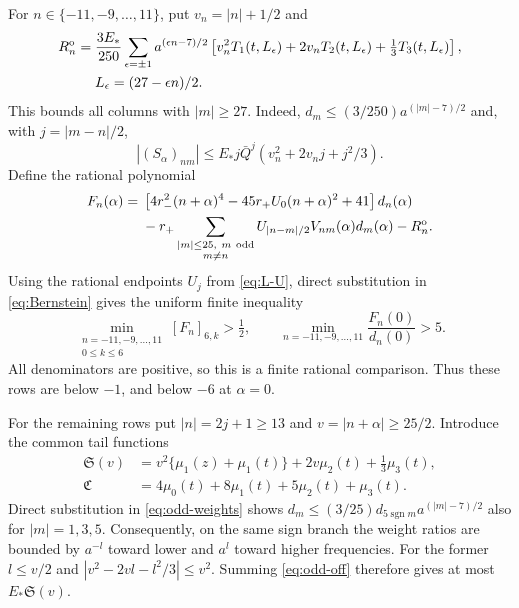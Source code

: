 \documentclass[a4paper,11pt]{article}
\numberwithin{equation}{section}
\theoremstyle{definition}
\theoremstyle{remark}
\begin{document}
For $n\in\{-11,-9,\ldots,11\}$, put $v_n=|n|+1/2$ and
\begin{align}
 R_n^{\rm o}={}&\frac{3E_*}{250}\sum_{\epsilon=\pm1}a^{(\epsilon n-7)/2}
 \left[v_n^2T_1(t,L_\epsilon)+2v_nT_2(t,L_\epsilon)
 +\tfrac13T_3(t,L_\epsilon)\right],\label{eq:odd-row-tail}\\
 &L_\epsilon=(27-\epsilon n)/2.\nonumber
\end{align}
This bounds all columns with $|m|\ge27$. Indeed, $d_m\le(3/250)a^{(|m|-7)/2}$ and, with $j=|m-n|/2$,
\begin{equation}\label{eq:complex-off-majorant}
 |(S_\alpha)_{nm}|\le E_*j\bar Q^j
 (v_n^2+2v_nj+j^2/3).
\end{equation}
Define the rational polynomial
\begin{align}
 F_n(\alpha)={}&\left[4r_-^2(n+\alpha)^4-45r_+U_0(n+\alpha)^2+41\right]d_n(\alpha)
 \nonumber\\
 &-r_+\sum_{\substack{|m|\le25,\ m\ \mathrm{odd}\\m\ne n}}
 U_{|n-m|/2}V_{nm}(\alpha)d_m(\alpha)-R_n^{\rm o}.
 \label{eq:odd-F}
\end{align}
Using the rational endpoints $U_j$ from \eqref{eq:L-U}, direct substitution in \eqref{eq:Bernstein} gives the uniform finite inequality
\begin{equation}\label{eq:odd-uniform}
 \min_{\substack{n=-11,-9,\ldots,11\\0\le k\le6}}[F_n]_{6,k}>\tfrac12,\qquad
 \min_{n=-11,-9,\ldots,11}\frac{F_n(0)}{d_n(0)}>5.
\end{equation}
All denominators are positive, so this is a finite rational comparison. Thus these rows are below $-1$, and below $-6$ at $\alpha=0$.

For the remaining rows put $|n|=2j+1\ge13$ and $v=|n+\alpha|\ge25/2$. Introduce the common tail functions
\begin{equation}\label{eq:common-tail-moments}
\begin{aligned}
 \mathfrak S(v)&=v^2\{\mu_1(z)+\mu_1(t)\}+2v\mu_2(t)+\tfrac13\mu_3(t),\\
 \mathfrak C&=4\mu_0(t)+8\mu_1(t)+5\mu_2(t)+\mu_3(t).
\end{aligned}
\end{equation}
Direct substitution in \eqref{eq:odd-weights} shows $d_m\le(3/25)d_{5\operatorname{sgn}m}a^{(|m|-7)/2}$ also for $|m|=1,3,5$. Consequently, on the same sign branch the weight ratios are bounded by $a^{-l}$ toward lower and $a^l$ toward higher frequencies. For the former $l\le v/2$ and $|v^2-2vl-l^2/3|\le v^2$. Summing \eqref{eq:odd-off} therefore gives at most $E_*\mathfrak S(v)$.
\end{document}
